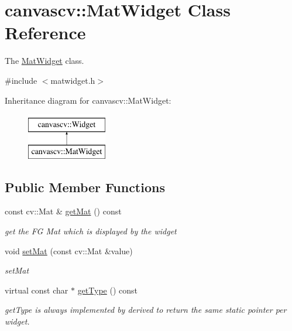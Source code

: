 \hypertarget{classcanvascv_1_1MatWidget}{}\section{canvascv\+:\+:Mat\+Widget Class Reference}
\label{classcanvascv_1_1MatWidget}


The \hyperlink{classcanvascv_1_1MatWidget}{Mat\+Widget} class.  




{\ttfamily \#include $<$matwidget.\+h$>$}

Inheritance diagram for canvascv\+:\+:Mat\+Widget\+:\begin{figure}[H]
\begin{center}
\leavevmode
\includegraphics[height=2.000000cm]{classcanvascv_1_1MatWidget}
\end{center}
\end{figure}
\subsection*{Public Member Functions}
\begin{DoxyCompactItemize}
\item 
const cv\+::\+Mat \& \hyperlink{classcanvascv_1_1MatWidget_ae6d1de3cf8ba58584154fa4f5d38dbe6}{get\+Mat} () const \hypertarget{classcanvascv_1_1MatWidget_ae6d1de3cf8ba58584154fa4f5d38dbe6}{}\label{classcanvascv_1_1MatWidget_ae6d1de3cf8ba58584154fa4f5d38dbe6}

\begin{DoxyCompactList}\small\item\em get the FG Mat which is displayed by the widget \end{DoxyCompactList}\item 
void \hyperlink{classcanvascv_1_1MatWidget_af46e7d8f9a6c4a3688f1fad6e5ad351e}{set\+Mat} (const cv\+::\+Mat \&value)
\begin{DoxyCompactList}\small\item\em set\+Mat \end{DoxyCompactList}\item 
virtual const char $\ast$ \hyperlink{classcanvascv_1_1MatWidget_abb3e9e14071456367a4e6717d064f1dd}{get\+Type} () const 
\begin{DoxyCompactList}\small\item\em get\+Type is always implemented by derived to return the same static pointer per widget. \end{DoxyCompactList}\end{DoxyCompactItemize}
